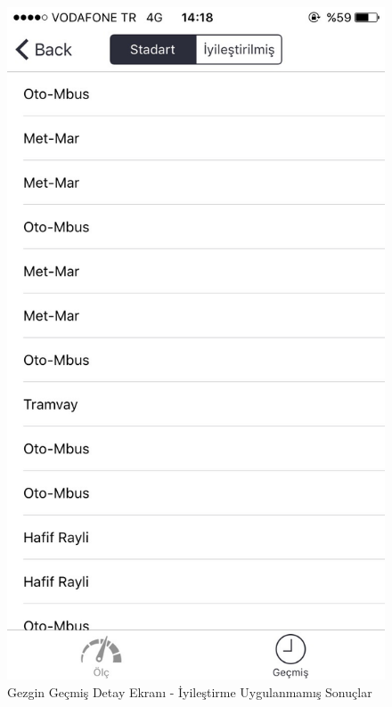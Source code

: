 \begin{figure}[!htbp]
\centering
\includegraphics[scale=0.2]{projectChapters/images/IMG_0367.jpg}
\caption{Gezgin Geçmiş Detay Ekranı - İyileştirme Uygulanmamış Sonuçlar}
\end{figure}

